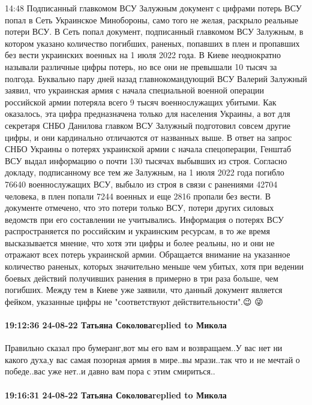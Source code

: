 14:48
Подписанный главкомом ВСУ Залужным документ с цифрами потерь ВСУ попал в Сеть
Украинское Минобороны, само того не желая, раскрыло реальные потери ВСУ. В Сеть попал документ, подписанный главкомом ВСУ Залужным, в котором указано количество погибших, раненых, попавших в плен и пропавших без вести украинских военных на 1 июля 2022 года.
В Киеве неоднократно называли различные цифры потерь, но все они не превышали 10 тысяч за полгода. Буквально пару дней назад главнокомандующий ВСУ Валерий Залужный заявил, что украинская армия с начала специальной военной операции российской армии потеряла всего 9 тысяч военнослужащих убитыми.
Как оказалось, эта цифра предназначена только для населения Украины, а вот для секретаря СНБО Данилова главком ВСУ Залужный подготовил совсем другие цифры, и они кардинально отличаются от названных выше. В ответ на запрос СНБО Украины о потерях украинской армии с начала спецоперации, Генштаб ВСУ выдал информацию о почти 130 тысячах выбывших из строя. Согласно докладу, подписанному все тем же Залужным, на 1 июля 2022 года погибло 76640 военнослужащих ВСУ, выбыло из строя в связи с ранениями 42704 человека, в плен попали 7244 военных и еще 2816 пропали без вести. В документе отмечено, что это потери только ВСУ, потери других силовых ведомств при его составлении не учитывались.
Информация о потерях ВСУ распространяется по российским и украинским ресурсам, в то же время высказывается мнение, что хотя эти цифры и более реальны, но и они не отражают всех потерь украинской армии. Обращается внимание на указанное количество раненых, которых значительно меньше чем убитых, хотя при ведении боевых действий получивших ранения в примерно в три раза больше, чем погибших.
Между тем в Киеве уже заявили, что данный документ является фейком, указанные цифры не "соответствуют действительности".😉 😜

\paragraph{19:12:36 24-08-22 Татьяна Соколоваreplied to Микола}

Правильно сказал про бумеранг,вот мы его вам и возвращаем..У вас нет ни какого
духа,у вас самая позорная армия в мире..вы мрази..так что и не мечтай о
победе..вас уже нет..и давно вам пора с этим смириться..

\paragraph{19:16:31 24-08-22 Татьяна Соколоваreplied to Микола}

